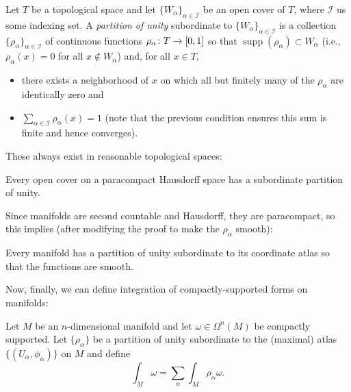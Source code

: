 \begin{definition}\label{def:partition of unity}
	Let $T$ be a topological space and let $\{W_\alpha\}_{\alpha \in \mathcal{I}}$ be an open cover of $T$, where $\mathcal{I}$ us some indexing set. A \emph{partition of unity} subordinate to $\{W_\alpha\}_{\alpha \in \mathcal{I}}$ is a collection $\{\rho_\alpha\}_{\alpha \in \mathcal{I}}$ of continuous functions $\rho_\alpha \colon\thinspace\! T \to [0,1]$ so that $\operatorname{supp}(\rho_\alpha) \subset W_\alpha$ (i.e., $\rho_\alpha(x) = 0$ for all $x \notin W_\alpha$) and, for all $x \in T$,
	\begin{itemize}
		\item there exists a neighborhood of $x$ on which all but finitely many of the $\rho_\alpha$ are identically zero and
		\item $\sum_{\alpha \in \mathcal{I}} \rho_\alpha(x) = 1$ (note that the previous condition ensures this sum is finite and hence converges).
	\end{itemize}
\end{definition}

These always exist in reasonable topological spaces:

\begin{theorem}\label{thm:existence of partitions of unity}
	Every open cover on a paracompact Hausdorff space has a subordinate partition of unity.
\end{theorem}

Since manifolds are second countable and Hausdorff, they are paracompact, so this implies (after modifying the proof to make the $\rho_\alpha$ smooth):

\begin{corollary}\label{cor:existence of partitions of unity on manifolds}
	Every manifold has a partition of unity subordinate to its coordinate atlas so that the functions are smooth.
\end{corollary}

Now, finally, we can define integration of compactly-supported forms on manifolds:

\begin{definition}\label{def:integration}
	Let $M$ be an $n$-dimensional manifold and let $\omega \in \Omega^n(M)$ be compactly supported. Let $\{\rho_\alpha\}$ be a partition of unity subordinate to the (maximal) atlas $\{(U_\alpha, \phi_\alpha)\}$ on $M$ and define
	\[
		\int_M \omega = \sum_{\alpha} \int_M \rho_\alpha \omega.
	\]
\end{definition}

